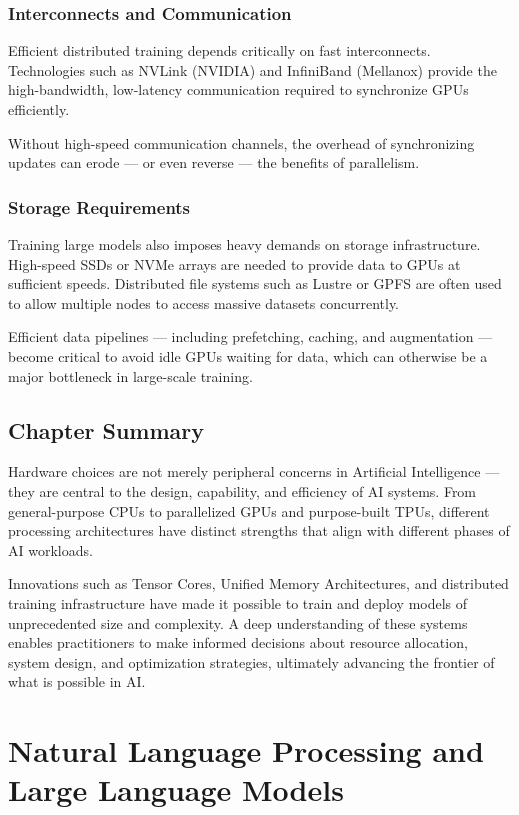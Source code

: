 \documentclass[openany]{book}
\begin{document}
\subsection{Interconnects and Communication}
Efficient distributed training depends critically on fast interconnects. 
Technologies such as NVLink (NVIDIA) and InfiniBand (Mellanox) provide the 
high-bandwidth, low-latency communication required to synchronize GPUs 
efficiently.

Without high-speed communication channels, the overhead of synchronizing updates 
can erode — or even reverse — the benefits of parallelism.

\subsection{Storage Requirements}
Training large models also imposes heavy demands on storage infrastructure. 
High-speed SSDs or NVMe arrays are needed to provide data to GPUs at sufficient 
speeds. Distributed file systems such as Lustre or GPFS are often used to allow 
multiple nodes to access massive datasets concurrently.

Efficient data pipelines — including prefetching, caching, and augmentation — 
become critical to avoid idle GPUs waiting for data, which can otherwise be a 
major bottleneck in large-scale training.

\section{Chapter Summary}

Hardware choices are not merely peripheral concerns in Artificial Intelligence — 
they are central to the design, capability, and efficiency of AI systems. From 
general-purpose CPUs to parallelized GPUs and purpose-built TPUs, different 
processing architectures have distinct strengths that align with different 
phases of AI workloads.

Innovations such as Tensor Cores, Unified Memory Architectures, and distributed 
training infrastructure have made it possible to train and deploy models of 
unprecedented size and complexity. A deep understanding of these systems enables 
practitioners to make informed decisions about resource allocation, system 
design, and optimization strategies, ultimately advancing the frontier of what 
is possible in AI.

\chapter{Natural Language Processing and Large Language Models}
\end{document}
